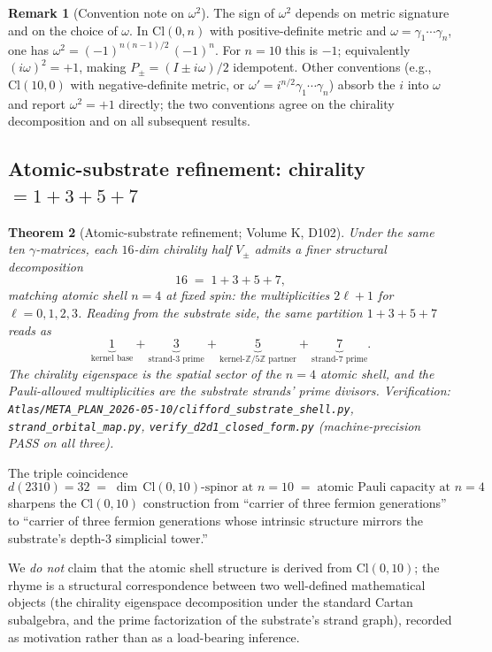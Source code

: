 \documentclass[11pt,reqno]{amsart}
\newtheorem{theorem}{Theorem}[section]
\theoremstyle{definition}
\newtheorem{remark}[theorem]{Remark}
\newcommand{\Z}{\mathbb{Z}}
\newcommand{\Cl}{\mathrm{Cl}}
\begin{document}
\begin{remark}[Convention note on $\omega^2$]
\label{rem:omega-sign}
The sign of $\omega^2$ depends on metric signature and on the choice
of $\omega$. In $\Cl(0, n)$ with positive-definite metric and
$\omega = \gamma_1 \cdots \gamma_n$, one has $\omega^2 = (-1)^{n(n-1)/2}\,
(-1)^n$. For $n = 10$ this is $-1$; equivalently $(i\omega)^2 = +1$,
making $P_\pm = (I \pm i\omega)/2$ idempotent. Other conventions
(e.g., $\Cl(10, 0)$ with negative-definite metric, or
$\omega' = i^{n/2} \gamma_1 \cdots \gamma_n$) absorb the $i$ into
$\omega$ and report $\omega^2 = +1$ directly; the two conventions
agree on the chirality decomposition and on all subsequent results.
\end{remark}

\subsection{Atomic-substrate refinement: chirality $= 1 + 3 + 5 + 7$}
\label{sec:atomic}

\begin{theorem}[Atomic-substrate refinement; Volume K, D102]
\label{thm:atomic-shell}
Under the same ten $\gamma$-matrices, each $16$-dim chirality half
$V_\pm$ admits a finer structural decomposition
\[
  16 \;=\; 1 + 3 + 5 + 7,
\]
matching atomic shell $n = 4$ at fixed spin: the multiplicities
$2\ell+1$ for $\ell = 0, 1, 2, 3$. Reading from the substrate side,
the same partition $1 + 3 + 5 + 7$ reads as
\[
  \underbrace{1}_{\text{kernel base}}
  + \underbrace{3}_{\text{strand-$3$ prime}}
  + \underbrace{5}_{\text{kernel-$\Z/5\Z$ partner}}
  + \underbrace{7}_{\text{strand-$7$ prime}}.
\]
The chirality eigenspace is the spatial sector of the $n = 4$
atomic shell, and the Pauli-allowed multiplicities are the
substrate strands' prime divisors. Verification:
\texttt{Atlas/META\_PLAN\_2026-05-10/clifford\_substrate\_shell.py},
\texttt{strand\_orbital\_map.py},
\texttt{verify\_d2d1\_closed\_form.py}
\cite{Sanders2026VolumeK} (machine-precision PASS on all three).
\end{theorem}

The triple coincidence
\[
  d(2310) = 32 \;=\; \dim\, \Cl(0, 10)\text{-spinor at }n = 10
       \;=\; \text{atomic Pauli capacity at }n = 4
\]
sharpens the $\Cl(0, 10)$ construction from ``carrier of three
fermion generations'' to ``carrier of three fermion generations
whose intrinsic structure mirrors the substrate's depth-$3$
simplicial tower.''

We \emph{do not} claim that the atomic shell structure is derived
from $\Cl(0, 10)$; the rhyme is a structural correspondence between
two well-defined mathematical objects (the chirality eigenspace
decomposition under the standard Cartan subalgebra, and the prime
factorization of the substrate's strand graph), recorded as
motivation rather than as a load-bearing inference.
\end{document}
